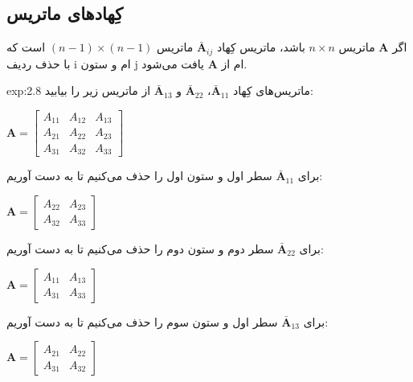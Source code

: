 \subsection{\textbf{کِهاد‌های ماتریس}}
\label{subsec:2.5.1}
{
    \Large
    \begin{spacing}{1.3}
        اگر $\textbf{A}$ ماتریس $n\times n$ باشد، ماتریس کِهاد $\bar{\textbf{A}}_{ij}$ ماتریس $(n-1)\times (n-1)$ است که با حذف ردیف i ام و ستون j ام از $\textbf{A}$ یافت می‌شود.

        \begin{example}{exp:2.8}
            \Large
            ماتریس‌های کِهاد $\bar{\textbf{A}}_{11}$، $\bar{\textbf{A}}_{22}$ و $\bar{\textbf{A}}_{13}$ از ماتریس زیر را بیابید:

            \begin{center}
                $\textbf{A}=\begin{bmatrix}
                                A_{11} & A_{12} & A_{13} \\
                                A_{21} & A_{22} & A_{23} \\
                                A_{31} & A_{32} & A_{33}
                \end{bmatrix}$
            \end{center}

            برای $\bar{\textbf{A}}_{11}$ سطر اول و ستون اول را حذف می‌کنیم تا به دست آوریم:

            \begin{center}
                $\textbf{A}=\begin{bmatrix}
                                A_{22} & A_{23} \\
                                A_{32} & A_{33}
                \end{bmatrix}$
            \end{center}

            برای $\bar{\textbf{A}}_{22}$ سطر دوم و ستون دوم را حذف می‌کنیم تا به دست آوریم:

            \begin{center}
                $\textbf{A}=\begin{bmatrix}
                                A_{11} & A_{13} \\
                                A_{31} & A_{33}
                \end{bmatrix}$
            \end{center}

            برای $\bar{\textbf{A}}_{13}$ سطر اول و ستون سوم را حذف می‌کنیم تا به دست آوریم:

            \begin{center}
                $\textbf{A}=\begin{bmatrix}
                                A_{21} & A_{22} \\
                                A_{31} & A_{32}
                \end{bmatrix}$
            \end{center}
        \end{example}
    \end{spacing}
}
